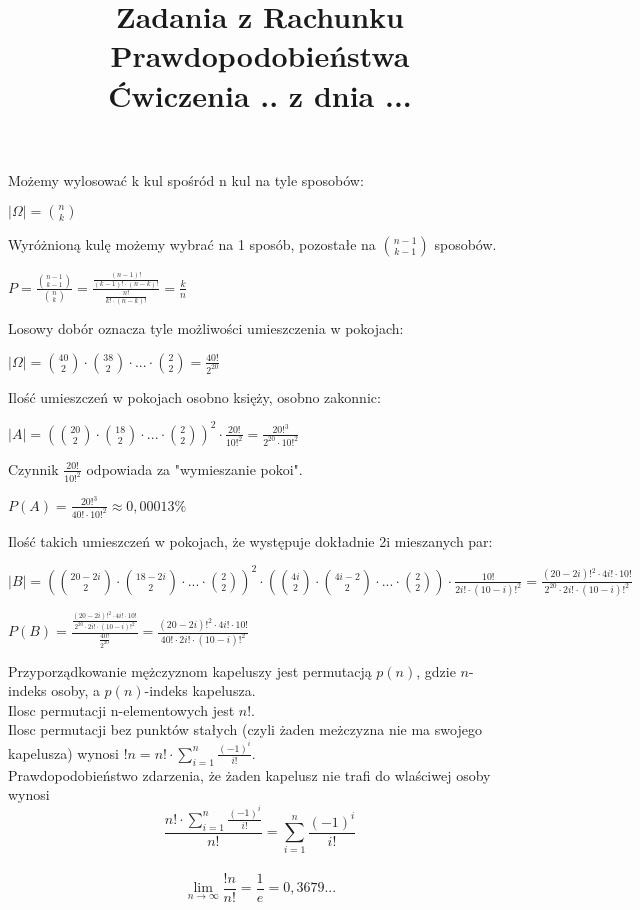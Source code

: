 \documentclass[fleqn]{article}
\begin{document}
\title{Zadania z Rachunku Prawdopodobieństwa \\ Ćwiczenia .. z dnia ...}
\date{}
\medskip
{}
\medskip

Możemy wylosować k kul spośród n kul na tyle sposobów:

$|\Omega|={n\choose k}$

Wyróżnioną kulę możemy wybrać na 1 sposób, pozostałe na ${n-1\choose k-1}$ sposobów.

$P=\frac{{n-1\choose k-1}}{{n\choose k}}=\frac{\frac{(n-1)!}{(k-1)!\cdot(n-k)!}}{\frac{n!}{k!\cdot(n-k)!}}=\frac{k}{n}$

\medskip
{}
\medskip

Losowy dobór oznacza tyle możliwości umieszczenia w pokojach:

$|\Omega|={40\choose 2}\cdot{38\choose 2}\cdot...\cdot{2\choose 2}=\frac{40!}{2^{20}}$

Ilość umieszczeń w pokojach osobno księży, osobno zakonnic:

$|A|=\left({20\choose 2}\cdot{18\choose 2}\cdot...\cdot{2\choose 2}\right)^{2}\cdot\frac{20!}{10!^2}=\frac{20!^3}{2^{20}\cdot10!^2}$

Czynnik $\frac{20!}{10!^2}$ odpowiada za "wymieszanie pokoi".

$P(A)=\frac{20!^3}{40!\cdot10!^2}\approx0,00013\%$

Ilość takich umieszczeń w pokojach, że występuje dokładnie 2i mieszanych par:

$|B|=\left({20-2i\choose 2}\cdot{18-2i\choose 2}\cdot...\cdot{2\choose 2}\right)^{2}\cdot\left({4i\choose 2}\cdot{4i-2\choose 2}\cdot...\cdot{2\choose 2}\right)\cdot\frac{10!}{2i!\cdot(10-i)!^2}=\frac{(20-2i)!^2\cdot4i!\cdot10!}{2^{20}\cdot2i!\cdot(10-i)!^2}$

$P(B)=\frac{\frac{(20-2i)!^2\cdot4i!\cdot10!}{2^{20}\cdot2i!\cdot(10-i)!^2}}{\frac{40!}{2^{20}}}=\frac{(20-2i)!^2\cdot4i!\cdot10!}{40!\cdot2i!\cdot(10-i)!^2}$

\medskip
{}
\medskip

Przyporządkowanie mężczyznom kapeluszy jest permutacją $p(n)$, gdzie $n$-indeks osoby, a $p(n)$-indeks kapelusza. \\
Ilosc permutacji n-elementowych jest $n!$. \\
Ilosc permutacji bez punktów stałych (czyli żaden meżczyzna nie ma swojego kapelusza) wynosi ${!n} = {n!}\cdot\sum_{i=1}^{n} \frac{(-1)^{i}}{i!}$. \\
Prawdopodobieństwo zdarzenia, że żaden kapelusz nie trafi do wlaściwej osoby wynosi
\[\frac{{n!}\cdot\sum_{i=1}^{n} \frac{(-1)^{i}}{i!}}{n!} = \sum_{i=1}^{n} \frac{(-1)^{i}}{i!}\]
\\
\[\lim_{n\to\infty} \frac{!n}{n!} = \frac{1}{e} = 0,3679...\]
\end{document}
